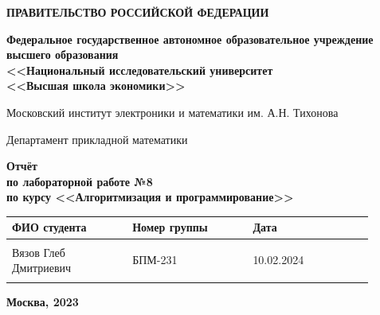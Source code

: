 \documentclass[12pt]{article}
\begin{document}
\thispagestyle{empty}
\begin{center}
\textbf{ПРАВИТЕЛЬСТВО РОССИЙСКОЙ ФЕДЕРАЦИИ}

\vspace{5ex}
	
\textbf{Федеральное государственное автономное образовательное учреждение \\ высшего образования \\ <<Национальный исследовательский университет \\ <<Высшая школа экономики>>}
\end{center}
\vspace{5ex}

\begin{center}
    Московский институт электроники и математики им. А.Н. Тихонова  
    
    \vspace{5ex}
    
    Департамент прикладной математики
    
    \vspace{10ex}
    \textbf{Отчёт \\ по лабораторной работе №8 \\ по курсу <<Алгоритмизация и программирование>>}
	\vspace{7ex}

\end{center}

\begin{center} 
\begin{tabular}{| p{0.3\linewidth}| p{0.3\linewidth}| p{0.3\linewidth}|}
 \hline	
ФИО студента & Номер группы & Дата \\  \hline
 & & \\  
Вязов Глеб \newline Дмитриевич & БПМ-231 & 10.02.2024\\  
 & & \\  \hline		
\end{tabular}
\end{center}

\begin{center}
	\vspace{3ex}
	
	\vfill
   
   \normalsize
    
	\textbf{Москва, 2023}
\end{center}

\newpage

\end{document}
